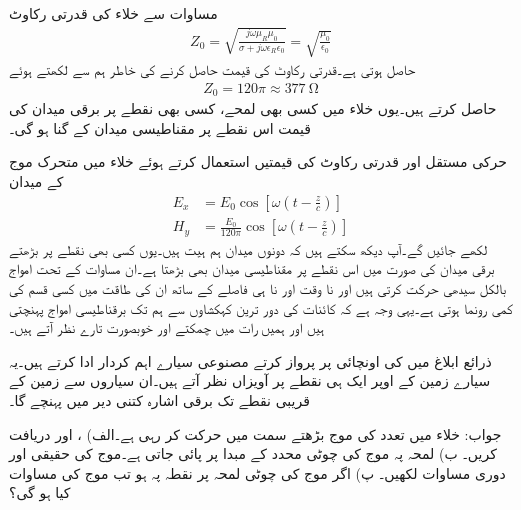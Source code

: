 مساوات  سے خلاء کی قدرتی رکاوٹ
\begin{align*}
Z_0 =\sqrt{\frac{j \omega \mu_R \mu_0}{\sigma +j \omega \epsilon_R \epsilon_0}}=\sqrt{\frac{\mu_0}{\epsilon_0}}
\end{align*}
حاصل ہوتی ہے۔قدرتی رکاوٹ کی قیمت حاصل کرنے کی خاطر ہم  سے  لکھتے ہوئے
\begin{align}
Z_0=120 \pi \approx \SI{377}{\ohm}
\end{align}
حاصل کرتے ہیں۔یوں خلاء میں کسی بھی لمحے، کسی بھی نقطے پر برقی میدان کی قیمت اس نقطے پر مقناطیسی میدان کے  گنا ہو گی۔

حرکی مستقل اور قدرتی رکاوٹ کی قیمتیں استعمال کرتے ہوئے خلاء میں متحرک موج کے میدان
\begin{align*}
E_x&=E_0 \cos \left[\omega \left( t -\frac{z}{c} \right)\right]\\
H_y&=\frac{E_0}{120 \pi} \cos \left[ \omega \left( t -\frac{z}{c} \right) \right]
\end{align*}
لکھے جائیں گے۔آپ دیکھ سکتے ہیں کہ دونوں میدان ہم ہیت ہیں۔یوں کسی بھی نقطے پر بڑھتے برقی میدان کی صورت میں اس نقطے پر مقناطیسی میدان بھی بڑھتا ہے۔ان مساوات کے تحت امواج بالکل سیدھی حرکت کرتی ہیں اور نا وقت اور نا ہی فاصلے کے ساتھ ان کی طاقت میں کسی قسم کی کمی رونما ہوتی ہے۔یہی وجہ ہے کہ کائنات کی دور ترین کہکشاوں سے ہم تک برقناطیسی امواج پہنچتی ہیں اور ہمیں رات میں چمکتے اور خوبصورت تارے نظر آتے ہیں۔


 ذرائع ابلاغ میں  کی اونچائی پر پرواز کرتے مصنوعی سیارے اہم کردار ادا کرتے ہیں۔یہ سیارے زمین کے اوپر ایک ہی نقطے پر آویزاں نظر آتے ہیں۔ان سیاروں سے زمین کے قریبی نقطے تک برقی اشارہ کتنی دیر میں پہنچے گا۔

جواب:
خلاء میں  تعدد کی موج بڑھتے  سمت میں حرکت کر رہی ہے۔الف) ،  اور  دریافت کریں۔ ب) لمحہ  پہ موج کی  چوٹی  محدد کے مبدا پر پائی جاتی ہے۔موج کی حقیقی اور دوری مساوات لکھیں۔ پ) اگر موج کی چوٹی لمحہ  پر نقطہ  پہ ہو تب موج کی مساوات کیا ہو گی؟ 

